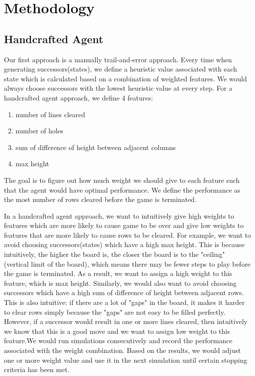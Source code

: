 \documentclass[letterpaper]{article} %
\begin{document}

\section{Methodology}

\subsection{Handcrafted Agent}

Our first approach is a manually trail-and-error approach. Every time when generating successors(states), we define a heuristic value associated with each state which is calculated based on a combination of weighted features. We would always choose successors with the lowest heuristic value at every step. For a handcrafted agent approach, we define 4 features:
\begin{enumerate}
  \item number of lines cleared
  \item number of holes
  \item sum of difference of height between adjacent columns
  \item max height
\end{enumerate}

The goal is to figure out how much weight we should give to each feature such that the agent would have optimal performance. We define the performance as the most number of rows cleared before the game is terminated.

In a handcrafted agent approach, we want to intuitively give high weights to features which are more likely to cause game to be over and give low weights to features that are more likely to cause rows to be cleared. For example, we want to avoid choosing successors(states) which have a high max height. This is because intuitively, the higher the board is, the closer the board is to the "ceiling" (vertical limit of the board), which means there may be fewer steps to play before the game is terminated. As a result, we want to assign a high weight to this feature, which is max height. Similarly, we would also want to avoid choosing successors which have a high sum of difference of height between adjacent rows. This is also intuitive: if there are a lot of "gaps" in the board, it makes it harder to clear rows simply because the "gaps" are not easy to be filled perfectly. However, if a successor would result in one or more lines cleared, then intuitively we know that this is a good move and we want to assign low weight to this feature.We would run simulations consecutively and record the performance associated with the weight combination. Based on the results, we would adjust one or more weight value and use it in the next simulation until certain stopping criteria has been met.
\end{document}
